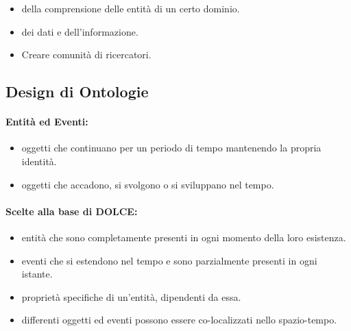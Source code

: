 
\begin{itemize}
  \item {} della comprensione delle entità di un certo dominio. 
  \item {} dei dati e dell'informazione. 
  \item Creare comunità di ricercatori.
\end{itemize}

\subsection{Design di Ontologie}

\paragraph{Entità ed Eventi:}

\begin{itemize}
  \item {} oggetti che continuano per un periodo di tempo mantenendo la propria identità. 
  \item {} oggetti che accadono, si svolgono o si sviluppano nel tempo.
\end{itemize}




\paragraph{Scelte alla base di DOLCE:}

\begin{itemize}
  \item {} entità  che sono completamente presenti in ogni momento della loro esistenza. 
  \item {} eventi che si estendono nel tempo e sono parzialmente presenti in ogni istante. 
  \item {} proprietà specifiche di un'entità, dipendenti da essa. 
  \item {} differenti oggetti ed eventi possono essere co-localizzati nello spazio-tempo.
\end{itemize}


